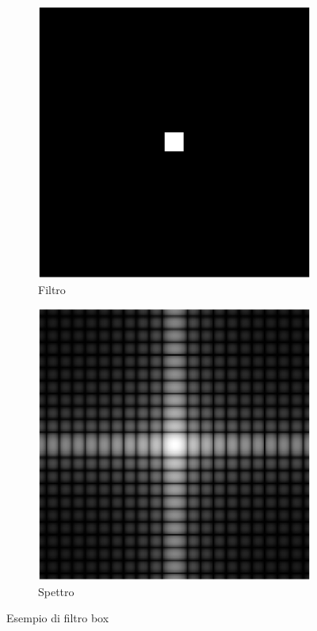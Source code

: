 \documentclass[../main.tex]{subfiles}
\begin{document}
\begin{figure}[ht]
	\centering
	\begin{subfigure}{0.4\linewidth}
		\centering
		\includegraphics[keepaspectratio, width=\linewidth]{images/box_spatial.png}
		\caption{Filtro}
	\end{subfigure}
	\hspace{20pt}
	\begin{subfigure}{0.4\linewidth}
		\centering
		\includegraphics[keepaspectratio, width=\linewidth]{images/box_spectrum.png}
		\caption{Spettro}
	\end{subfigure}
	\caption{Esempio di filtro box}
\end{figure}
\end{document}
